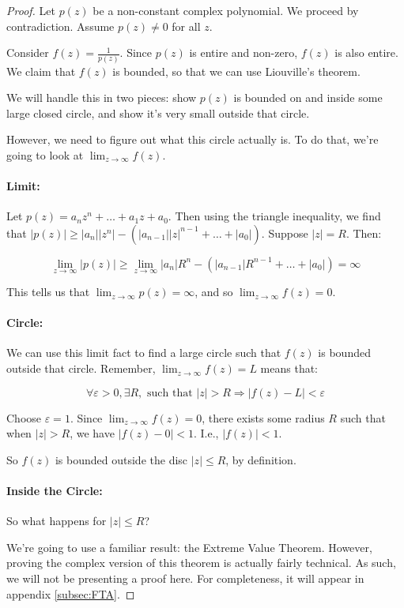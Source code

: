 \begin{proof} Let $p(z)$ be a non-constant complex polynomial. We proceed by contradiction. Assume $p(z) \ne 0$ for all $z$.

Consider $f(z) = \frac{1}{p(z)}$. Since $p(z)$ is entire and non-zero, $f(z)$ is also entire. We claim that $f(z)$ is bounded, so that we can use Liouville's theorem.

We will handle this in two pieces: show $p(z)$ is bounded on and inside some large closed circle, and show it's very small outside that circle.

However, we need to figure out what this circle actually is. To do that, we're going to look at $\lim_{z\rightarrow \infty} f(z)$.


\paragraph{Limit:} Let $p(z) = a_nz^n + \dots + a_1z + a_0$. Then using the triangle inequality, we find that $|p(z)| \ge |a_n||z^n| - (|a_{n-1}||z|^{n-1} + \dots + |a_0|)$. Suppose $|z| = R$. Then:

$$\lim_{z\rightarrow \infty} |p(z)| \ge \lim_{z\rightarrow \infty} |a_n|R^n - (|a_{n-1}|R^{n-1} + \dots + |a_0|) = \infty$$

This tells us that $\lim_{z\rightarrow \infty} p(z) = \infty$, and so $\lim_{z\rightarrow \infty} f(z) = 0$.


\paragraph{Circle:} We can use this limit fact to find a large circle such that $f(z)$ is bounded outside that circle. Remember, $\lim_{z\rightarrow \infty} f(z) = L$ means that:

$$\forall \varepsilon>0, \exists R, \text{ such that } |z| > R \Rightarrow |f(z) - L| < \varepsilon$$

Choose $\varepsilon = 1$. Since $\lim_{z\rightarrow \infty} f(z) = 0$, there exists some radius $R$ such that when $|z| > R$, we have $|f(z) - 0| < 1$. I.e., $|f(z)| < 1$.

So $f(z)$ is bounded outside the disc $|z| \le R$, by definition.

\paragraph{Inside the Circle:} So what happens for $|z| \le R$? 

We're going to use a familiar result: the Extreme Value Theorem. However, proving the complex version of this theorem is actually fairly technical. As such, we will not be presenting a proof here. For completeness, it will appear in appendix \ref{subsec:FTA}.


\end{proof}
